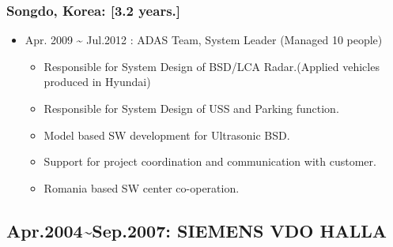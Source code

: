 \documentclass[12pt,a4paper]{article}
\begin{document}
\subsubsection{Songdo, Korea: [3.2 years.]}
\begin{itemize}
\item Apr. 2009 {\textasciitilde} Jul.2012 : ADAS Team, System Leader (Managed 10 people)

\begin{itemize}
\item Responsible for System Design of BSD/LCA Radar.(Applied vehicles produced in Hyundai)


\item Responsible for System Design of USS and Parking function.


\item Model based SW development for Ultrasonic BSD.


\item Support for project coordination and communication with customer.


\item Romania based SW center co-operation.

\end{itemize}
\end{itemize}
\subsection{Apr.2004{\textasciitilde}Sep.2007: SIEMENS VDO HALLA}
\end{document}
